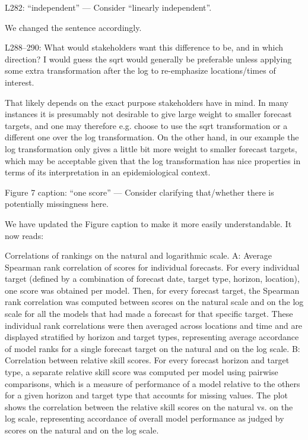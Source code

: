 \documentclass{article}
\newcommand{\black}{\color{black}}
\newcommand{\blue}{\color{blue}}
\newcommand{\indented}{\setlength{\leftskip}{1cm}}
\newcommand{\notindented}{\setlength{\leftskip}{0cm}}
\begin{document}
\notindented

\blue
L282: “independent” — Consider “linearly independent”.

\black
We changed the sentence accordingly.

\black

\blue
L288–290: What would stakeholders want this difference to be, and in
which direction? I would guess the sqrt would generally be preferable unless applying some extra transformation after the log to re-emphasize locations/times of interest.

\black
That likely depends on the exact purpose stakeholders have in mind. In many instances it is presumably not desirable to give large weight to smaller forecast targets, and one may therefore e.g. choose to use the sqrt transformation or a different one over the log transformation. On the other hand, in our example the log transformation only gives a little bit more weight to smaller forecast targets, which may be acceptable given that the log transformation has nice properties in terms of its interpretation in an epidemiological context. 

\blue
Figure 7 caption: “one score” — Consider clarifying that/whether there is potentially missingness here.

\black
We have updated the Figure caption to make it more easily understandable. It now reads: 

\indented
Correlations of rankings on the natural and logarithmic scale. A: Average Spearman rank correlation of scores for individual forecasts. For every individual target (defined by a combination of forecast date, target type, horizon, location), one score was obtained per model. Then, for every forecast target, the Spearman rank correlation was computed between scores on the natural scale and on the log scale for all the models that had made a forecast for that specific target. These individual rank correlations were then averaged across locations and time and are displayed stratified by horizon and target types, representing average accordance of model ranks for a single forecast target on the natural and on the log scale. B: Correlation between relative skill scores. For every forecast horizon and target type, a separate relative skill score was computed per model using pairwise comparisons, which is a measure of performance of a model relative to the others for a given horizon and target type that accounts for missing values. The plot shows the correlation between the relative skill scores on the natural vs. on the log scale, representing accordance of overall model performance as judged by scores on the natural and on the log scale.
\end{document}
